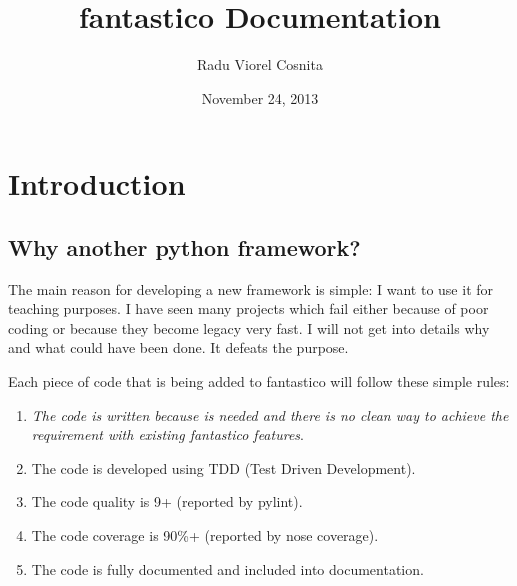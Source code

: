 \documentclass[letterpaper,10pt,english]{sphinxmanual}
\title{fantastico Documentation}
\date{November 24, 2013}
\author{Radu Viorel Cosnita}
\begin{document}
\maketitle
\tableofcontents
{}\label{index::doc}



\chapter{Introduction}
\label{intro:introduction}\label{intro::doc}\label{intro:fantastico-framework}

\section{Why another python framework?}
\label{intro:why-another-python-framework}
The main reason for developing a new framework is simple: I want to use it for teaching purposes. I have seen many projects which
fail either because of poor coding or because they become legacy very fast. I will not get into details why and what could have
been done. It defeats the purpose.

Each piece of code that is being added to fantastico will follow these simple rules:
\begin{enumerate}
\item {} 
\emph{The code is written because is needed and there is no clean way to achieve the requirement with existing fantastico features}.

\item {} 
The code is developed using TDD (Test Driven Development).

\item {} 
The code quality is 9+ (reported by pylint).

\item {} 
The code coverage is 90\%+ (reported by nose coverage).

\item {} 
The code is fully documented and included into documentation.

\end{enumerate}
\end{document}
